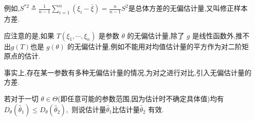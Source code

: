 \documentclass[10pt]{yerbaformat}
\begin{document}
\par 例如,$S^{* 2} \triangleq \frac{1}{n-1} \sum_{i=1}^{n}\left(\xi_{i}-\bar{\xi}\right)=\frac{n}{n-1} S^{2}$是总体方差的无偏估计量,又叫修正样本方差.

\par 应注意的是,如果 $T\left(\xi_{1}, \cdots, \xi_{n}\right)$ 是参数 $\theta$ 的无偏估计量,除了 $g$ 是线性函数外,推不出$g(T)$也是 $g(\theta)$ 的无偏估计量,例如不能用对均值估计量的平方作为对二阶矩原点的估计.

\par 事实上,存在某一参数有多种无偏估计量的情况,为对之进行对比,引入无偏估计量的方差.

\begin{definition}
    若对于一切 $\theta \in \Theta$(即任意可能的参数范围,因为估计时不确定具体值)均有$D_{\theta}\left(\hat{\theta}_{1}\right) \leqslant D_{\theta}\left(\hat{\theta}_{2}\right),$ 则说估计量$\hat{\theta}_{1}$比估计量$\hat{\theta}_{2}$ 有效.
\end{definition}
\end{document}
